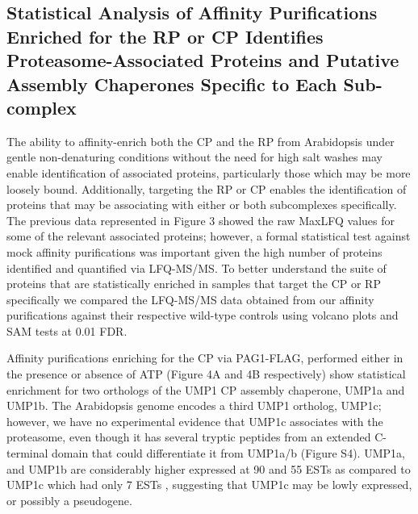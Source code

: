 \subsection{Statistical Analysis of Affinity Purifications Enriched for the RP or CP Identifies Proteasome-Associated Proteins and Putative Assembly Chaperones Specific to Each Sub-complex}
	The ability to affinity-enrich both the CP and the RP from Arabidopsis under gentle non-denaturing conditions without the need for high salt washes may enable identification of associated proteins, particularly those which may be more loosely bound. Additionally, targeting the RP or CP enables the identification of proteins that may be associating with either or both subcomplexes specifically. The previous data represented in Figure 3 showed the raw MaxLFQ values for some of the relevant associated proteins; however, a formal statistical test against mock affinity purifications was important given the high number of proteins identified and quantified via LFQ-MS/MS. To better understand the suite of proteins that are statistically enriched in samples that target the CP or RP specifically we compared the LFQ-MS/MS data obtained from our affinity purifications against their respective wild-type controls using volcano plots and SAM tests at 0.01 FDR.

	Affinity purifications enriching for the CP via PAG1-FLAG, performed either in the presence or absence of ATP (Figure 4A and 4B respectively) show statistical enrichment for two orthologs of the UMP1 CP assembly chaperone, UMP1a and UMP1b. The Arabidopsis genome encodes a third UMP1 ortholog, UMP1c; however, we have no experimental evidence that UMP1c associates with the proteasome, even though it has several tryptic peptides from an extended C-terminal domain that could differentiate it from UMP1a/b (Figure S4). UMP1a, and UMP1b are considerably higher expressed at 90 and 55 ESTs as compared to UMP1c which had only 7 ESTs , suggesting that UMP1c may be lowly expressed, or possibly a pseudogene. 

